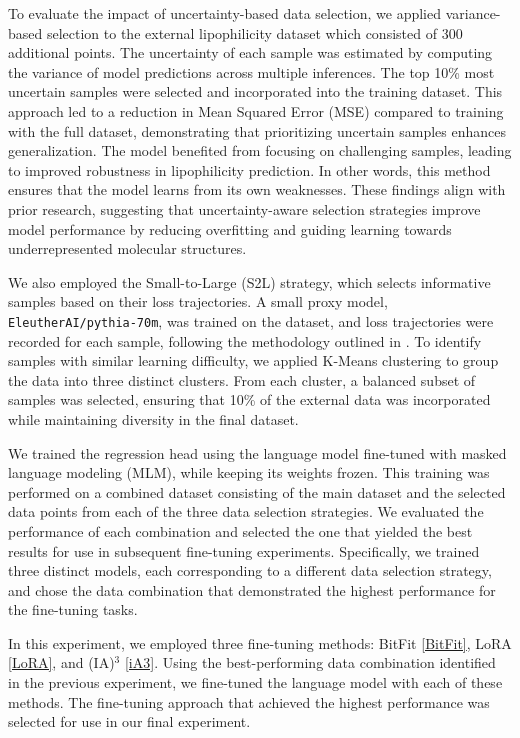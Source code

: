 \documentclass[11pt]{article}
\begin{document}
To evaluate the impact of uncertainty-based data selection, we applied variance-based selection to the external lipophilicity dataset which consisted of 300 additional points. The uncertainty of each sample was estimated by computing the variance of model predictions across multiple inferences. The top 10\% most uncertain samples were selected and incorporated into the training dataset. This approach led to a reduction in Mean Squared Error (MSE) compared to training with the full dataset, demonstrating that prioritizing uncertain samples enhances generalization. The model benefited from focusing on challenging samples, leading to improved robustness in lipophilicity prediction. In other words, this method ensures that the model learns from its own weaknesses. These findings align with prior research, suggesting that uncertainty-aware selection strategies improve model performance by reducing overfitting and guiding learning towards underrepresented molecular structures\cite{nigam2021assigning}.

We also employed the Small-to-Large (S2L) strategy, which selects informative samples based on their loss trajectories. A small proxy model, \texttt{EleutherAI/pythia-70m}, was trained on the dataset, and loss trajectories were recorded for each sample, following the methodology outlined in \cite{yang2023small}. To identify samples with similar learning difficulty, we applied K-Means clustering to group the data into three distinct clusters. From each cluster, a balanced subset of samples was selected, ensuring that 10\% of the external data was incorporated while maintaining diversity in the final dataset.  




We trained the regression head using the language model fine-tuned with masked language modeling (MLM), while keeping its weights frozen. This training was performed on a combined dataset consisting of the main dataset and the selected data points from each of the three data selection strategies. We evaluated the performance of each combination and selected the one that yielded the best results for use in subsequent fine-tuning experiments. Specifically, we trained three distinct models, each corresponding to a different data selection strategy, and chose the data combination that demonstrated the highest performance for the fine-tuning tasks.

In this experiment, we employed three fine-tuning methods: BitFit \ref{BitFit}, LoRA \ref{LoRA}, and (IA)$^3$ \ref{iA3}. Using the best-performing data combination identified in the previous experiment, we fine-tuned the language model with each of these methods. The fine-tuning approach that achieved the highest performance was selected for use in our final experiment.
\end{document}
